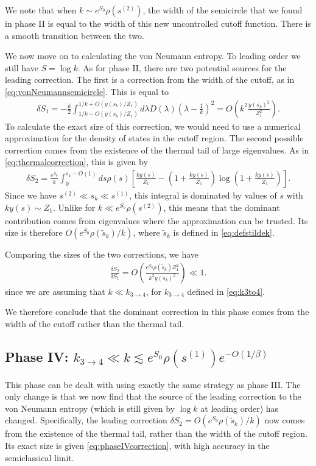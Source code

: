 \documentclass[12pt]{article}
\renewcommand{\tilde}{\widetilde}
\newcommand{\smax}{s_k}
\newcommand{\stilde}{\tilde{s}_k}
\numberwithin{equation}{section}
\begin{document}
We note that when $k \sim e^{S_0} \rho(s^{(2)})$, the width of the semicircle that we found in phase II is equal to the width of this new uncontrolled cutoff function. There is a smooth transition between the two.

We now move on to calculating the von Neumann entropy. To leading order we still have $S = \log k$. As for phase II, there are two potential sources for the leading correction. The first is a correction from the width of the cutoff, as in \eqref{eq:vonNeumannsemicircle}. This is equal to
\begin{align}  \label{eq:phase3cutoffcorrection}
\delta S_1 = - \frac{k}{2}\int_{1/k - O(y(\smax)/Z_1)}^{1/k + O(y(\smax)/Z_1)}  d \lambda D(\lambda) (\lambda - \frac{1}{k})^2 = O(k^2 \frac{y(\smax)^2}{Z_1^2}).
\end{align}
To calculate the exact size of this correction, we would need to use a numerical approximation for the density of states in the cutoff region. The second possible correction comes from the existence of the thermal tail of large eigenvalues. As in \eqref{eq:thermalcorrection}, this is given by
\begin{align} \label{eq:phaseIVcorrection}
\delta S_2 = \frac{e^{S_0}}{k} \int_0^{\smax - O(1)} ds \rho(s) \left[\frac{ky(s)}{Z_1} - \left(1 +\frac{k y(s)}{Z_1}\right) \log \left(1 + \frac{k y(s)}{Z_1}\right)\right].
\end{align}
Since we have $s^{(2)} \ll \smax \ll s^{(1)}$, this integral is dominated by values of $s$ with $k y(s)\sim Z_1$. Unlike for $k \ll e^{S_0} \rho(s^{(2)})$, this means that the dominant contribution comes from eigenvalues where the approximation can be trusted. Its size is therefore $O(e^{S_0} \rho(\stilde)/k)$, where $\stilde$ is defined in \eqref{eq:defstildek}.

Comparing the sizes of the two corrections, we have
\begin{align}
\frac{\delta S_2}{\delta S_1} = O\left(\frac{e^{S_0} \rho(\stilde) Z_1^2}{k^3 y(\smax)^2}\right) \ll 1.
\end{align}
since we are assuming that $k \ll k_{3 \to 4}$, for $k_{3 \to 4}$ defined in \eqref{eq:k3to4}.

We therefore conclude that the dominant correction in this phase comes from the width of the cutoff rather than the thermal tail.

\subsection*{Phase IV: $k_{3 \to 4} \ll k \lesssim e^{S_0} \rho( s^{(1)})e^{-O(1/\beta)}$ }
This phase can be dealt with using exactly the same strategy as phase III. The only change is that we now find that the source of the leading correction to the von Neumann entropy (which is still given by $\log k$ at leading order) has changed. Specifically, the leading correction $\delta S_2 = O(e^{S_0} \rho(\stilde)/k)$ now comes from the existence of the thermal tail, rather than the width of the cutoff region. Its exact size is given \eqref{eq:phaseIVcorrection}, with high accuracy in the semiclassical limit.
\end{document}
